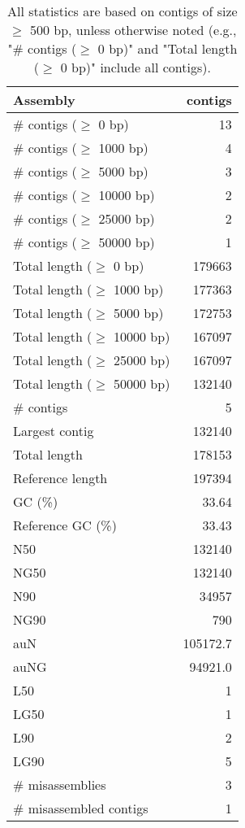 \documentclass[12pt,a4paper]{article}
\begin{document}
\begin{table}[ht]
\begin{center}
\caption{All statistics are based on contigs of size $\geq$ 500 bp, unless otherwise noted (e.g., "\# contigs ($\geq$ 0 bp)" and "Total length ($\geq$ 0 bp)" include all contigs).}
\begin{tabular}{|l*{1}{|r}|}
\hline
Assembly & contigs \\ \hline
\# contigs ($\geq$ 0 bp) & 13 \\ \hline
\# contigs ($\geq$ 1000 bp) & 4 \\ \hline
\# contigs ($\geq$ 5000 bp) & 3 \\ \hline
\# contigs ($\geq$ 10000 bp) & 2 \\ \hline
\# contigs ($\geq$ 25000 bp) & 2 \\ \hline
\# contigs ($\geq$ 50000 bp) & 1 \\ \hline
Total length ($\geq$ 0 bp) & 179663 \\ \hline
Total length ($\geq$ 1000 bp) & 177363 \\ \hline
Total length ($\geq$ 5000 bp) & 172753 \\ \hline
Total length ($\geq$ 10000 bp) & 167097 \\ \hline
Total length ($\geq$ 25000 bp) & 167097 \\ \hline
Total length ($\geq$ 50000 bp) & 132140 \\ \hline
\# contigs & 5 \\ \hline
Largest contig & 132140 \\ \hline
Total length & 178153 \\ \hline
Reference length & 197394 \\ \hline
GC (\%) & 33.64 \\ \hline
Reference GC (\%) & 33.43 \\ \hline
N50 & 132140 \\ \hline
NG50 & 132140 \\ \hline
N90 & 34957 \\ \hline
NG90 & 790 \\ \hline
auN & 105172.7 \\ \hline
auNG & 94921.0 \\ \hline
L50 & 1 \\ \hline
LG50 & 1 \\ \hline
L90 & 2 \\ \hline
LG90 & 5 \\ \hline
\# misassemblies & 3 \\ \hline
\# misassembled contigs & 1 \\ \hline

\end{tabular}
\end{center}
\end{table}
\end{document}
